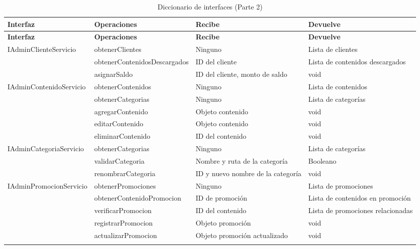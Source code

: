 \begin{longtable}{|p{5cm}|p{4cm}|p{3.5cm}|p{3.5cm}|}
\caption{Diccionario de interfaces (Parte 2)}
\label{tab:diccionario_interfaces_2} \\

\hline
\textbf{Interfaz} & \textbf{Operaciones} & \textbf{Recibe} & \textbf{Devuelve} \\ \hline
\endfirsthead

\hline
\textbf{Interfaz} & \textbf{Operaciones} & \textbf{Recibe} & \textbf{Devuelve} \\ \hline
\endhead

\multirow{3}{5cm}{IAdminClienteServicio} 
    & obtenerClientes & Ninguno & Lista de clientes \\ \cline{2-4}
    & obtenerContenidosDescargados & ID del cliente & Lista de contenidos descargados \\ \cline{2-4}
    & asignarSaldo & ID del cliente, monto de saldo & void \\ \hline
\multirow{5}{5cm}{IAdminContenidoServicio} 
    & obtenerContenidos & Ninguno & Lista de contenidos \\ \cline{2-4}
    & obtenerCategorias & Ninguno & Lista de categorías \\ \cline{2-4}
    & agregarContenido & Objeto contenido & void \\ \cline{2-4}
    & editarContenido & Objeto contenido & void \\ \cline{2-4}
    & eliminarContenido & ID del contenido & void \\ \hline
\multirow{3}{5cm}{IAdminCategoriaServicio} 
    & obtenerCategorias & Ninguno & Lista de categorías \\ \cline{2-4}
    & validarCategoria & Nombre y ruta de la categoría & Booleano \\ \cline{2-4}
    & renombrarCategoria & ID y nuevo nombre de la categoría & void \\ \hline
\multirow{6}{5cm}{IAdminPromocionServicio} 
    & obtenerPromociones & Ninguno & Lista de promociones \\ \cline{2-4}
    & obtenerContenidoPromocion & ID de promoción & Lista de contenidos en promoción \\ \cline{2-4}
    & verificarPromocion & ID del contenido & Lista de promociones relacionadas \\ \cline{2-4}
    & registrarPromocion & Objeto promoción & void \\ \cline{2-4}
    & actualizarPromocion & Objeto promoción actualizado & void \\ \cline{2-4}

\end{longtable}

